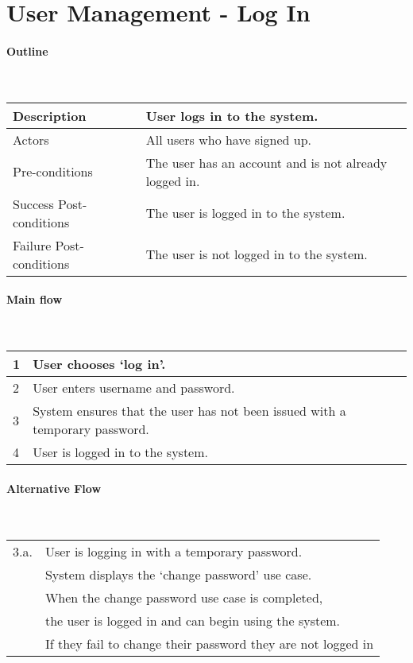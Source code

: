 \section*{User Management - Log In} %

\paragraph*{Outline} \

\begin{tabular}{ | l | l | }
\hline
Description & User logs in to the system. \\ \hline
Actors & All users who have signed up. \\ \hline
Pre-conditions & The user has an account and is not already logged in. \\ \hline
Success Post-conditions & The user is logged in to the system. \\ \hline
Failure Post-conditions & The user is not logged in to the system. \\ \hline
\end{tabular}


\paragraph*{Main flow} \

\begin{tabular}{ | l | l | } \hline
1 & User chooses `log in'. \\ \hline
2 & User enters username and password. \\ \hline
3 & System ensures that the user has not been issued with a temporary password. \\ \hline
4 & User is logged in to the system. \\ \hline
\end{tabular}


\paragraph*{Alternative Flow} \

\begin{tabular}{ | l | l | } \hline
3.a. & User is logging in with a temporary password. \\
     & System displays the `change password' use case. \\
     & When the change password use case is completed,  \\
  & the user is logged in and can begin using the system.  \\
	 & If they fail to change their password they are not logged in \\ \hline
\end{tabular}
